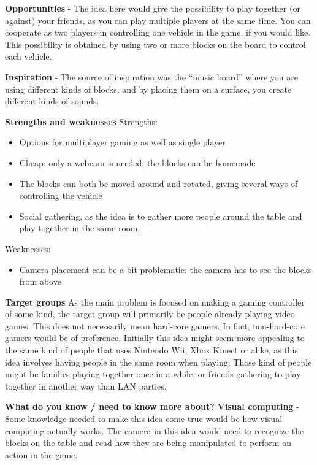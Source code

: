 \noindent\textbf{Opportunities} - The idea here would give the possibility to play together (or against) your friends, as you can play multiple players at the same time. You can cooperate as two players in controlling one vehicle in the game, if you would like. This possibility is obtained by using two or more blocks on the board to control each vehicle.
\bigskip

\noindent\textbf{Inspiration} - The source of inspiration was the “music board” where you are using different kinds of blocks, and by placing them on a surface, you create different kinds of sounds. 
\bigskip

\noindent\textbf{Strengths and weaknesses} \newline
Strengths:
\begin{itemize}
\item Options for multiplayer gaming as well as single player
\item Cheap: only a webcam is needed, the blocks can be homemade
\item The blocks can both be moved around and rotated, giving several ways of controlling the vehicle
\item Social gathering, as the idea is to gather more people around the table and play together in the same room.
\end{itemize}
Weaknesses:
\begin{itemize}
\item Camera placement can be a bit problematic: the camera has to see the blocks from above
\end{itemize}
\bigskip

\noindent\textbf{Target groups} \newline
As the main problem is focused on making a gaming controller of some kind, the target group will primarily be people already playing video games. This does not necessarily mean hard-core gamers. In fact, non-hard-core gamers would be of preference. Initially this idea might seem more appealing to the same kind of people that uses Nintendo Wii, Xbox Kinect or alike, as this idea involves having people in the same room when playing. Those kind of people might be families playing together once in a while, or friends gathering to play together in another way than LAN parties.
\bigskip

\noindent\textbf{What do you know / need to know more about?} \newline
\noindent\textbf{Visual computing} - Some knowledge needed to make this idea come true would be how visual computing actually works. The camera in this idea would need to recognize the blocks on the table and read how they are being manipulated to perform an action in the game. 
\bigskip


